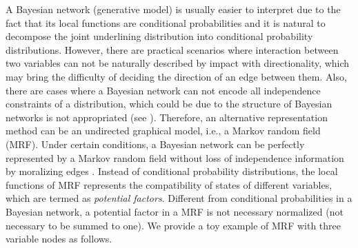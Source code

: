 A Bayesian network (generative model) is usually easier to interpret due to the fact that its local functions are conditional probabilities and it is natural to decompose the joint underlining distribution into conditional probability distributions. However, there are practical scenarios where interaction between two variables can not be naturally described by impact with directionality, which may bring the difficulty of deciding the direction of an edge between them. Also, there are cases where a Bayesian network can not encode all independence constraints of a distribution, which could be due to the structure of Bayesian networks is not appropriated (see \cite[seciton~3.4.2]{koller2009pgm}). Therefore, an alternative representation method can be an undirected graphical model, i.e., a Markov random field (MRF). Under certain conditions, a Bayesian network can be perfectly represented by a Markov random field without loss of independence information by moralizing edges \cite[section~4.5]{koller2009pgm}\cite[section~8.3.4]{Bishop:2006:PRM:1162264}. Instead of conditional probability distributions, the local functions of MRF represents the compatibility of states of different variables, which are termed as \textit{potential factors}. Different from conditional probabilities in a Bayesian network, a potential factor in a MRF is not necessary normalized (not necessary to be summed to one). We provide a toy example of MRF with three variable nodes as follows.
